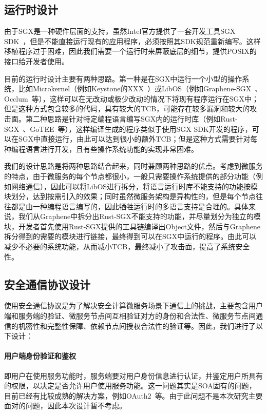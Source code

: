 \subsection{运行时设计}

由于SGX是一种硬件层面的支持，虽然Intel官方提供了一套开发工具SGX SDK~\cite{costan2016intel}，但是不能直接运行现有的应用程序，必须按照其SDK规范重新编写。这样移植程序过于困难，因此我们需要一个运行时来屏蔽底层的细节，提供POSIX的接口给开发者使用。

目前的运行时设计主要有两种思路。第一种是在SGX中运行一个小型的操作系统，比如Microkernel（例如Keystone的XXX~\cite{lee2020keystone}）或LibOS（例如Graphene-SGX~\cite{tsai2017graphene}、Occlum~\cite{shen2020occlum}等），这样可以在无改动或极少改动的情况下将现有程序运行在SGX中；但是这种方式包含较多的代码，具有较大的TCB，可能存在较多漏洞和较大的攻击面。第二种思路是针对特定编程语言编写SGX内的运行时库（例如Rust-SGX~\cite{wang2019towards}、GoTEE~\cite{ghosn2019secured}等），这样编译生成的程序类似于使用SGX SDK开发的程序，可以在SGX中直接运行，由此可以达到很小的额外TCB；但是这种方式需要针对每种编程语言进行开发，且有些操作系统功能的实现非常困难。

我们的设计思路是将两种思路结合起来，同时兼顾两种思路的优点。考虑到微服务的特点，由于微服务的每个节点都很小，一般只需要操作系统提供的部分功能（例如网络通信），因此可以将LibOS进行拆分，将语言运行时库不能支持的功能按模块划分，达到按需引入的效果；同时虽然微服务架构是异构性的，但是每个节点往往都是由一种编程语言编写的，因此牺牲运行时的多语言支持是合理的。具体来说，我们从Graphene中拆分出Rust-SGX不能支持的功能，并尽量划分为独立的模块，开发者首先使用Rust-SGX提供的工具链编译出Object文件，然后与Graphene拆分得到的需要的模块进行链接，最终得到可以在SGX中运行的程序。由此可以减少不必要的系统功能，从而减小TCB，最终减小了攻击面，提高了系统安全性。

\subsection{安全通信协议设计}

使用安全通信协议是为了解决安全计算微服务场景下通信上的挑战，主要包含用户端和服务端的验证、微服务节点间互相验证对方的身份和合法性、微服务节点间通信的机密性和完整性保障、依赖节点间授权合法性的验证等。因此，我们进行了以下设计：

\paragraph{用户端身份验证和鉴权}
即用户在使用服务功能时，服务端要对用户身份信息进行认证，并鉴定用户所具有的权限，以决定是否允许用户使用服务功能。这一问题其实是SOA固有的问题，目前已经有比较成熟的解决方案，例如OAuth2~\cite{oauth2spec}等。由于此问题不是本次研究主要面对的问题，因此本次设计暂不考虑。

